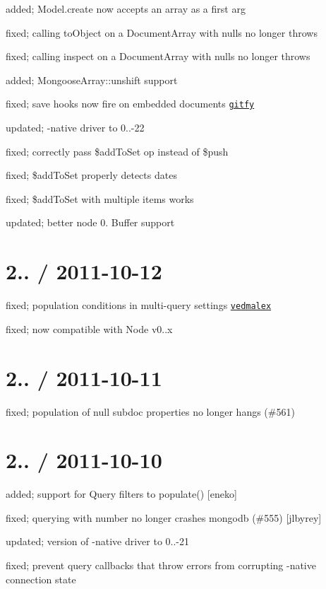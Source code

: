 \begin{DoxyItemize}
\item added; Model.\+create now accepts an array as a first arg
\item fixed; calling to\+Object on a Document\+Array with nulls no longer throws
\item fixed; calling inspect on a Document\+Array with nulls no longer throws
\item added; Mongoose\+Array\+::unshift support
\item fixed; save hooks now fire on embedded documents \href{#456}{\tt gitfy}
\item updated; -\/native driver to 0..-\/22
\item fixed; correctly pass \$add\+To\+Set op instead of \$push
\item fixed; \$add\+To\+Set properly detects dates
\item fixed; \$add\+To\+Set with multiple items works
\item updated; better node 0. Buffer support
\end{DoxyItemize}

\section*{2.. / 2011-\/10-\/12 }


\begin{DoxyItemize}
\item fixed; population conditions in multi-\/query settings \href{#563}{\tt vedmalex}
\item fixed; now compatible with Node v0..\+x
\end{DoxyItemize}

\section*{2.. / 2011-\/10-\/11 }


\begin{DoxyItemize}
\item fixed; population of null subdoc properties no longer hangs (\#561)
\end{DoxyItemize}

\section*{2.. / 2011-\/10-\/10 }


\begin{DoxyItemize}
\item added; support for Query filters to populate() \mbox{[}eneko\mbox{]}
\item fixed; querying with number no longer crashes mongodb (\#555) \mbox{[}jlbyrey\mbox{]}
\item updated; version of -\/native driver to 0..-\/21
\item fixed; prevent query callbacks that throw errors from corrupting -\/native connection state
\end{DoxyItemize}

